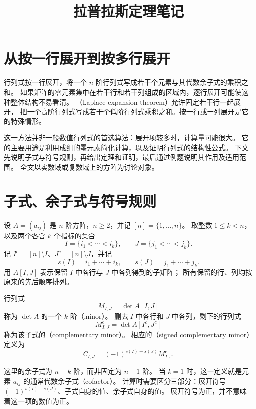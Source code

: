 \documentclass[UTF8,12pt,a4paper,fontset=fandol]{ctexart}
\title{拉普拉斯定理笔记}
\author{}
\date{}
\begin{document}
\maketitle

\section{从按一行展开到按多行展开}

行列式按一行展开，将一个 $n$ 阶行列式写成若干个元素与其代数余子式的乘积之和。
如果矩阵的零元素集中在若干行和若干列组成的区域内，逐行展开可能使这种整体结构不易看清。
（Laplace expansion theorem）允许固定若干行一起展开，
把一个高阶行列式写成若干个低阶行列式乘积之和。按一行或一列展开是它的特殊情形。

这一方法并非一般数值行列式的首选算法：展开项较多时，计算量可能很大。
它的主要用途是利用成组的零元素简化计算，以及证明行列式的结构性公式。
下文先说明子式与符号规则，再给出定理和证明，最后通过例题说明其作用及适用范围。
全文以实数域或复数域上的方阵为讨论对象。

\section{子式、余子式与符号规则}

设 $A=(a_{ij})$ 是 $n$ 阶方阵，$n\geq2$，并记 $[n]=\{1,\ldots,n\}$。
取整数 $1\leq k<n$，以及两个各含 $k$ 个指标的集合
\[
  I=\{i_1<\cdots<i_k\},\qquad J=\{j_1<\cdots<j_k\}.
\]
记 $I^c=[n]\setminus I$、$J^c=[n]\setminus J$，并记
\[
  s(I)=i_1+\cdots+i_k,\qquad s(J)=j_1+\cdots+j_k.
\]
用 $A[I,J]$ 表示保留 $I$ 中各行与 $J$ 中各列得到的子矩阵；
所有保留的行、列均按原来的先后顺序排列。

\begin{definition}[子式与余子式]
\label{def:laplace-minors}
行列式
\[
  M_{I,J}=\det A[I,J]
\]
称为 $\det A$ 的一个 $k$ 阶（minor）。
删去 $I$ 中各行和 $J$ 中各列，剩下的行列式
\[
  M^{\mathrm{c}}_{I,J}=\det A[I^c,J^c]
\]
称为该子式的（complementary minor）。
相应的（signed complementary minor）定义为
\begin{equation}
  C_{I,J}=(-1)^{s(I)+s(J)}M^{\mathrm{c}}_{I,J}.
  \label{eq:laplace-cofactor}
\end{equation}
\end{definition}

这里的余子式为 $n-k$ 阶，而非固定为 $n-1$ 阶。
当 $k=1$ 时，这一定义就是元素 $a_{ij}$ 的通常代数余子式（cofactor）。
计算时需要区分三部分：展开符号 $(-1)^{s(I)+s(J)}$、子式自身的值、余子式自身的值。
展开符号为正，并不意味着这一项的数值为正。
\end{document}
